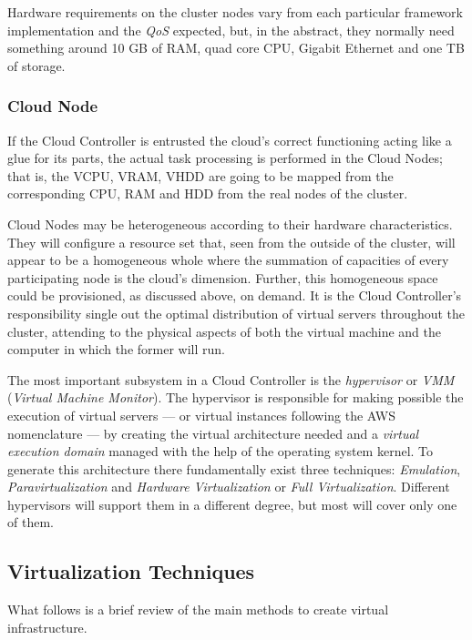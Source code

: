 Hardware requirements on the cluster nodes vary from each particular framework implementation and the \emph{QoS} expected, but, in the abstract, they normally need something around 10 GB of RAM, quad core CPU, Gigabit Ethernet and one TB of storage.


\subsubsection{Cloud Node}\label{subsubsec:cloudnode}

\noindent If the Cloud Controller is entrusted the cloud's correct functioning acting like a glue for its parts, the actual task processing is performed in the Cloud Nodes; that is, the VCPU, VRAM, VHDD are going to be mapped from the corresponding CPU, RAM and HDD from the real nodes of the cluster.

Cloud Nodes may be heterogeneous according to their hardware characteristics. They will configure a resource set that, seen from the outside of the cluster, will appear to be a homogeneous whole where the summation of capacities of every participating node is the cloud's dimension. Further, this homogeneous space could be provisioned, as discussed above, on demand. It is the Cloud Controller's responsibility single out the optimal distribution of virtual servers throughout the cluster, attending to the physical aspects of both the virtual machine and the computer in which the former will run.

The most important subsystem in a Cloud Controller is the \emph{hypervisor} or \emph{VMM} (\emph{Virtual Machine Monitor}). The hypervisor is responsible for making possible the execution of virtual servers --- or virtual instances following the AWS nomenclature --- by creating the virtual architecture needed and a \emph{virtual execution domain} managed with the help of the operating system kernel. To generate this architecture there fundamentally exist three techniques: \emph{Emulation}, \emph{Paravirtualization} and \emph{Hardware Virtualization} or \emph{Full Virtualization}. Different hypervisors will support them in a different degree, but most will cover only one of them.

\subsection{Virtualization Techniques}\label{subsec:tecnicasemu}

\noindent What follows is a brief review of the main methods to create virtual infrastructure.

